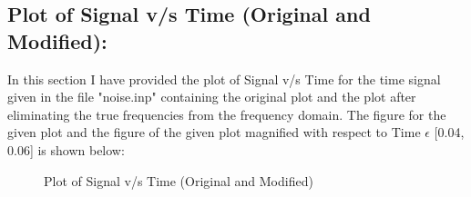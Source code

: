 \documentclass[12pt,a4paper]{article}
\begin{document}
\subsection{Plot of Signal v/s Time (Original and Modified):}
In this section I have provided the plot of Signal v/s Time for the time signal given in the file "noise.inp" containing the original plot and the plot after eliminating the true frequencies from the frequency domain. The figure for the given plot and the figure of the given plot magnified with respect to Time $\epsilon$ [0.04, 0.06] is shown below:
\begin{figure}[!ht]
	\begin{center}
	\end{center}
	\caption{Plot of Signal v/s Time (Original and Modified)}
\end{figure}
\end{document}
